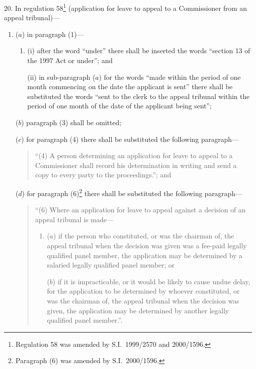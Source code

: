 \documentclass[12pt,a4paper]{article}
\begin{document}
20.  In regulation 58\footnote{Regulation 58 was amended by S.I.\ 1999/2570 and 2000/1596.} (application for leave to appeal to a Commissioner from an appeal tribunal)—
\begin{enumerate}\item[]
($a$) in paragraph (1)—
\begin{enumerate}\item[]
(i) after the word “under” there shall be inserted the words “section 13 of the 1997 Act or under”; and

(ii) in sub-paragraph ($a$)  for the words “made within the period of one month commencing on the date the applicant is sent” there shall be substituted the words “sent to the clerk to the appeal tribunal within the period of one month of the date of the applicant being sent”;
\end{enumerate}

($b$) paragraph (3) shall be omitted;

($c$) for paragraph (4) there shall be substituted the following paragraph—
\begin{quotation}
“(4) A person determining an application for leave to appeal to a Commissioner shall record his determination in writing and send a copy to every party to the proceedings.”; and
\end{quotation}

($d$) for paragraph (6)\footnote{Paragraph (6) was amended by S.I.\ 2000/1596.} there shall be substituted the following paragraph—
\begin{quotation}
“(6) Where an application for leave to appeal against a decision of an appeal tribunal is made—
\begin{enumerate}\item[]
($a$) if the person who constituted, or was the chairman of, the appeal tribunal when the decision was given was a fee-paid legally qualified panel member, the application may be determined by a salaried legally qualified panel member; or

($b$) if it is impracticable, or it would be likely to cause undue delay, for the application to be determined by whoever constituted, or was the chairman of, the appeal tribunal when the decision was given, the application may be determined by another legally qualified panel member.”.
\end{enumerate}
\end{quotation}
\end{enumerate}

\medskip
\end{document}
